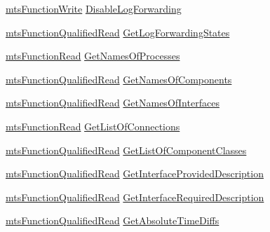 \begin{DoxyCompactItemize}
\item 
\hyperlink{classmts_function_write}{mts\-Function\-Write} \hyperlink{structmts_manager_component_client_1_1_interface_l_c_m_function_type_a53dd8af09a194f08f5bfa76661902ebb}{Disable\-Log\-Forwarding}
\item 
\hyperlink{classmts_function_qualified_read}{mts\-Function\-Qualified\-Read} \hyperlink{structmts_manager_component_client_1_1_interface_l_c_m_function_type_ad56a5bbc25eca92858ac6f81fa4b13d7}{Get\-Log\-Forwarding\-States}
\item 
\hyperlink{classmts_function_read}{mts\-Function\-Read} \hyperlink{structmts_manager_component_client_1_1_interface_l_c_m_function_type_ad640c4356d85cbd0e9988774c514d478}{Get\-Names\-Of\-Processes}
\item 
\hyperlink{classmts_function_qualified_read}{mts\-Function\-Qualified\-Read} \hyperlink{structmts_manager_component_client_1_1_interface_l_c_m_function_type_a179c57f73f4d15b4a6b0590a4e3c4064}{Get\-Names\-Of\-Components}
\item 
\hyperlink{classmts_function_qualified_read}{mts\-Function\-Qualified\-Read} \hyperlink{structmts_manager_component_client_1_1_interface_l_c_m_function_type_a782d881b9f81be71a60fda623594fcad}{Get\-Names\-Of\-Interfaces}
\item 
\hyperlink{classmts_function_read}{mts\-Function\-Read} \hyperlink{structmts_manager_component_client_1_1_interface_l_c_m_function_type_ac92cc2d929605d96bb2b33bdc056e46b}{Get\-List\-Of\-Connections}
\item 
\hyperlink{classmts_function_qualified_read}{mts\-Function\-Qualified\-Read} \hyperlink{structmts_manager_component_client_1_1_interface_l_c_m_function_type_a434d2629f88f0683c504a505b8e6aec5}{Get\-List\-Of\-Component\-Classes}
\item 
\hyperlink{classmts_function_qualified_read}{mts\-Function\-Qualified\-Read} \hyperlink{structmts_manager_component_client_1_1_interface_l_c_m_function_type_a605b54d29d4d2b3aa3fa0a001886c1fa}{Get\-Interface\-Provided\-Description}
\item 
\hyperlink{classmts_function_qualified_read}{mts\-Function\-Qualified\-Read} \hyperlink{structmts_manager_component_client_1_1_interface_l_c_m_function_type_af9337bd1144ed982e167e9ffb5935b09}{Get\-Interface\-Required\-Description}
\item 
\hyperlink{classmts_function_qualified_read}{mts\-Function\-Qualified\-Read} \hyperlink{structmts_manager_component_client_1_1_interface_l_c_m_function_type_a88d6e6e708c8e530d70df57375435d2b}{Get\-Absolute\-Time\-Diffs}
\end{DoxyCompactItemize}


